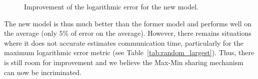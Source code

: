 \documentclass{sig-alternate}
\begin{document}
\begin{figure}[ht]
  \centering
  \hfil
  \caption{Improvement of the logarithmic error for the new model.}
  \label{fig:random_improvement}
\end{figure}

The new model is thus much better than the former \simgrid model and
performs well on the average (only $5\%$ of error on the
average). However, there remains situations where it does not accurate 
estimates communication time, particularly for the maximum logarithmic
error metric
(see Table~\ref{tab:random_largest}). Thus, there is still room for
improvement and we believe the Max-Min sharing mechanism can now be
incriminated.
\end{document}
